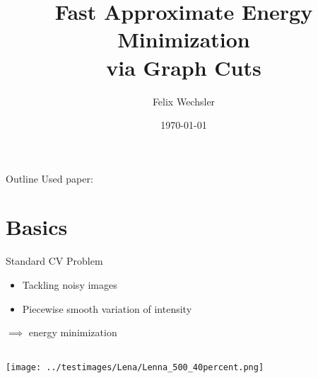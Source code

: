 \documentclass[mathserif]{beamer}
\title[Energy Minimization via Graph Cuts ]{Fast Approximate Energy Minimization \\via Graph Cuts}
\author[Felix Wechsler]{Felix Wechsler}
\institute[CAMP]{Computer Aided Medical Procedures \\Technische Universit\"at M\"unchen}
\date[]{\today}
\def\secslide{
    \begin{frame}
        \centering \Huge \secname
    \end{frame}
    \addtocounter{framenumber}{-1}
}
\begin{document}
\begin{frame}
    \titlepage
\end{frame}


\begin{frame}{Outline}
    \tableofcontents
    \small
    Used paper: \cite{paper}
\end{frame}

    
\section{Basics}
\secslide
\begin{frame}{Standard CV Problem}
    \begin{itemize}
        \item Tackling noisy images
        \item Piecewise smooth variation of intensity 
    \end{itemize}
    $\implies$ energy minimization 
    \vspace{1cm}
    \begin{columns}
        \begin{column}{.4\textwidth}
            \centering
            \texttt{[image: ../testimages/Lena/Lenna\_500\_40percent.png]}
        \end{column}
        \begin{column}{0.2\textwidth}
            \centering
        \end{column}
        \begin{column}{.4\textwidth}
            \centering
        \end{column}
    \end{columns}
\end{frame}
\end{document}
